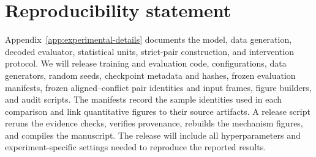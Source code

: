 \section*{Reproducibility statement}

Appendix~\ref{app:experimental-details} documents the model, data generation,
decoded evaluator, statistical units, strict-pair construction, and intervention
protocol. We will release training and evaluation code, configurations, data
generators, random seeds, checkpoint metadata and hashes, frozen evaluation
manifests, frozen aligned--conflict pair identities and input frames, figure
builders, and audit scripts. The manifests
record the sample identities used in each comparison and link quantitative
figures to their source artifacts. A release script reruns the evidence checks,
verifies provenance, rebuilds the mechanism figures, and compiles the
manuscript. The release will include all hyperparameters and
experiment-specific settings needed to reproduce the reported results.

